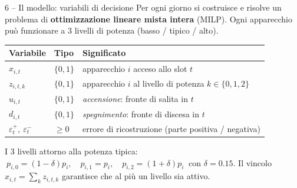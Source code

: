 \documentclass[aspectratio=169]{beamer}
\newcommand{\ep}{\varepsilon^{+}}
\newcommand{\en}{\varepsilon^{-}}
\begin{document}
\begin{frame}{6 -- Il modello: variabili di decisione}
  Per ogni giorno si costruisce e risolve un problema di \textbf{ottimizzazione lineare mista
  intera} (MILP). Ogni apparecchio pu\`o funzionare a 3 livelli di potenza (basso / tipico / alto).

  \vspace{0.5em}
  \begin{table}\small
    \renewcommand{\arraystretch}{1.25}
    \begin{tabularx}{\textwidth}{l l X}
      \toprule
      \textbf{Variabile} & \textbf{Tipo} & \textbf{Significato} \\
      \midrule
      $x_{i,t}$   & $\{0,1\}$ & apparecchio $i$ acceso allo slot $t$ \\
      $z_{i,t,k}$ & $\{0,1\}$ & apparecchio $i$ al livello di potenza $k\in\{0,1,2\}$ \\
      $u_{i,t}$   & $\{0,1\}$ & \emph{accensione}: fronte di salita in $t$ \\
      $d_{i,t}$   & $\{0,1\}$ & \emph{spegnimento}: fronte di discesa in $t$ \\
      $\ep_t,\ \en_t$ & $\ge 0$ & errore di ricostruzione (parte positiva / negativa) \\
      \bottomrule
    \end{tabularx}
  \end{table}

  \vspace{0.4em}
  \small
  I 3 livelli attorno alla potenza tipica: $\ p_{i,0}=(1-\delta)p_i,\quad p_{i,1}=p_i,\quad
  p_{i,2}=(1+\delta)p_i\ $ con $\delta = 0.15$.
  Il vincolo $x_{i,t}=\sum_k z_{i,t,k}$ garantisce che al pi\`u un livello sia attivo.
\end{frame}
\end{document}
